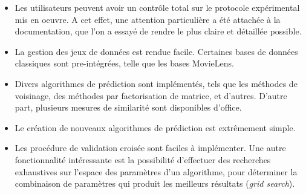 \begin{itemize}
  \item Les utilisateurs peuvent avoir un contrôle total sur le protocole
    expérimental mis en oeuvre. A cet effet, une attention particulière a été
    attachée à la documentation, que l'on a essayé de rendre le plus claire
    et détaillée possible.
  \item La gestion des jeux de données est rendue facile. Certaines bases de
    données classiques sont pre-intégrées, telle que les bases MovieLens.
  \item Divers algorithmes de prédiction sont implémentés, tels que les
    méthodes de voisinage, des méthodes par factorisation de matrice, et
    d'autres. D'autre part, plusieurs mesures de similarité sont disponibles
    d'office.
  \item Le création de nouveaux algorithmes de prédiction est extrêmement simple.
  \item Les procédure de validation croisée sont faciles à implémenter. Une autre
    fonctionnalité intéressante est la possibilité d'effectuer des recherches
    exhaustives sur l'espace des paramètres d'un algorithme, pour déterminer la
    combinaison de paramètres qui produit les meilleurs résultats (\textit{grid
    search}).
\end{itemize}
